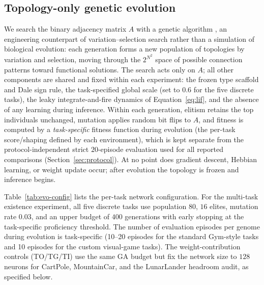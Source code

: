 \documentclass[10pt]{article}
\begin{document}
\subsection{Topology-only genetic evolution}
\label{sec:evolution}

We search the binary adjacency matrix $A$ with a genetic algorithm
\citep{holland1992,eiben2015}, an engineering counterpart of variation--selection
search rather than a simulation of biological evolution: each generation forms a
new population of topologies by variation and selection, moving through the
$2^{N^2}$ space of possible connection patterns toward functional solutions. The
search acts only on $A$; all other components are shared and fixed within each
experiment: the frozen type scaffold and Dale sign rule, the task-specified
global scale (set to $0.6$ for the five discrete tasks), the leaky
integrate-and-fire dynamics of Equation~\ref{eq:lif}, and the absence of any
learning during inference. Within
each generation, elitism retains the top individuals unchanged, mutation applies
random bit flips to $A$, and fitness is computed by a \emph{task-specific} fitness
function during evolution (the per-task score/shaping defined by each
environment), which is kept separate from the protocol-independent strict
$20$-episode evaluation used for all reported comparisons
(Section~\ref{sec:protocol}). At no point does gradient descent, Hebbian
learning, or weight update occur; after evolution the topology is frozen and
inference begins.

Table~\ref{tab:evo-config} lists the per-task network configuration. For the
multi-task existence experiment, all five discrete tasks use population $80$,
$16$ elites, mutation rate $0.03$, and an upper budget of $400$ generations with
early stopping at the task-specific proficiency threshold. The number of evaluation
episodes per genome during evolution is task-specific (10--20 episodes for the
standard Gym-style tasks and 10 episodes for the custom visual-game tasks). The
weight-contribution controls (TO/TG/TI) use the same GA budget but fix the network
size to $128$ neurons for CartPole, MountainCar, and the LunarLander headroom
audit, as specified below.
\end{document}
